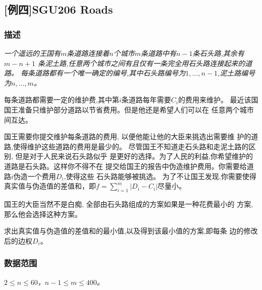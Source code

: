\subsection{[例四]SGU206 Roads}
\subsubsection{描述}
{\itshape
	一个遥远的王国有$m$条道路连接着$n$个城市$m$条道路中有$n-1$条石头路,其余有
		$m-n+1$ 条泥土路,任意两个城市之间有且仅有一条完全用石头路连接起来的道路。
		每条道路都有一个唯一确定的编号,其中石头路编号为$1, \ldots, n-1$,泥土路编号
		为$n, \ldots, m$。
		\par 每条道路都需要一定的维护费,其中第$i$条道路每年需要$C_i$的费用来维护。
		最近该国国王准备只维护部分道路以节省费用。但是他还是希望人们可以在
		任意两个城市间互达。
		\par 国王需要你提交维护每条道路的费用,
		以便他能让他的大臣来挑选出需要维
			护的道路,使得维护这些道路的费用是最少的。
			尽管国王不知道走石头路和走泥土路的区别,
		但是对于人民来说石头路似乎
			是更好的选择。为了人民的利益,你希望维护的道路是石头路。这样你不得不在
			提交给国王的报告中伪造维护费用。你需要给道路$i$伪造一个费用$D_i$,使得这些
			石头路能够被挑选。
			为了不让国王发现,你需要使得真实值与伪造值的差值和，即$f = \sum_{i=1}^m{|D_i - C_i|}$尽量小。
			\par 国王的大臣当然不是白痴,
		全部由石头路组成的方案如果是一种花费最小的
			方案,那么他会选择这种方案。
			\par
			求出真实值与伪造值的差值和的最小值,以及得到该最小值的方案,即每条
			边的修改后的边权$D_i$。
}
\subsubsection{数据范围}
{
\itshape
	$2 \le n \le 60$，$n-1 \le m \le 400$。
}
